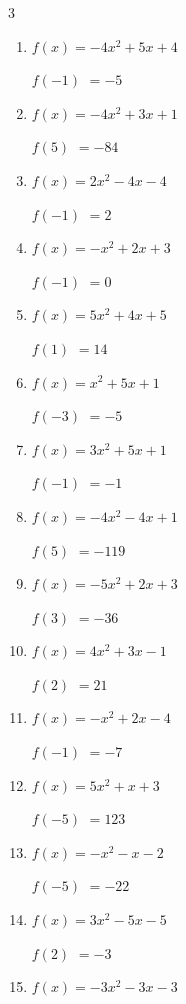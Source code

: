 \begin{multicols}{3}
\begin{enumerate}
$f(-2)$
        $= -15$

\columnbreak %

  \item $f(x)=-4x^{2}+5x+4$

$f(-1)$
        $= -5$

  \item $f(x)=-4x^{2}+3x+1$

$f(5)$
        $= -84$

  \item $f(x)=2x^{2}-4x-4$

$f(-1)$
        $= 2$

  \item $f(x)=-x^{2}+2x+3$

$f(-1)$
        $= 0$

  \item $f(x)=5x^{2}+4x+5$

$f(1)$
        $= 14$

  \item $f(x)=x^{2}+5x+1$

$f(-3)$
        $= -5$

  \item $f(x)=3x^{2}+5x+1$

$f(-1)$
        $= -1$

  \item $f(x)=-4x^{2}-4x+1$

$f(5)$
        $= -119$

  \item $f(x)=-5x^{2}+2x+3$

$f(3)$
        $= -36$

  \item $f(x)=4x^{2}+3x-1$

$f(2)$
        $= 21$

  \item $f(x)=-x^{2}+2x-4$

$f(-1)$
        $= -7$

  \item $f(x)=5x^{2}+x+3$

$f(-5)$
        $= 123$

  \item $f(x)=-x^{2}-x-2$

$f(-5)$
        $= -22$

  \item $f(x)=3x^{2}-5x-5$

$f(2)$
        $= -3$

  \item $f(x)=-3x^{2}-3x-3$


\end{enumerate}
\end{multicols}
